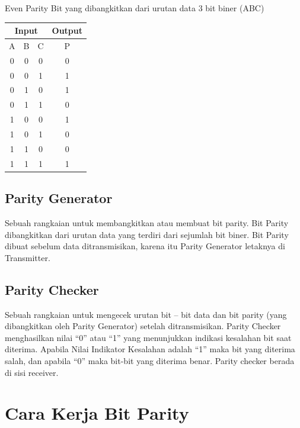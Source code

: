 Even Parity Bit yang dibangkitkan dari urutan data 3 bit biner (ABC)
\begin{table}[h!]
\begin{tabular}{|c|c|c|c|}
\hline
\multicolumn{3}{|c|}{Input} & Output\\
\hline
A & B & C & P\\
\hline
0 & 0 & 0 & 0\\
\hline
0 & 0 & 1 & 1\\
\hline
0 & 1 & 0 & 1\\
\hline
0 & 1 & 1 & 0\\
\hline
1 & 0 & 0 & 1\\
\hline
1 & 0 & 1 & 0\\
\hline
1 & 1 & 0 & 0\\
\hline
1 & 1 & 1 & 1\\
\hline
\end{tabular}
\end{table}

\subsection{Parity Generator}

Sebuah rangkaian untuk membangkitkan atau membuat bit parity. Bit Parity dibangkitkan dari urutan data yang terdiri dari sejumlah bit biner. Bit Parity dibuat sebelum data ditransmisikan, karena itu Parity Generator letaknya di Transmitter.

\subsection{Parity Checker}

Sebuah rangkaian untuk mengecek urutan bit – bit data dan bit parity (yang dibangkitkan oleh Parity Generator) setelah ditransmisikan. Parity Checker menghasilkan nilai “0” atau “1” yang menunjukkan indikasi kesalahan bit saat diterima. Apabila Nilai Indikator Kesalahan adalah “1” maka bit yang diterima salah, dan apabila “0” maka bit-bit yang diterima benar. Parity checker berada di sisi receiver.

\section{Cara Kerja Bit Parity}
